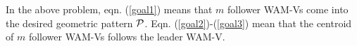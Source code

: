 \documentclass[letterpaper, 10 pt, conference]{ieeeconf}  %
\begin{document}
In the above problem, eqn. (\ref{goal1}) means that
$m$ follower WAM-Vs come into the desired geometric
pattern ${\cal P}$. Eqn. (\ref{goal2})-(\ref{goal3}) mean that the centroid of $m$ follower WAM-Vs follows the leader WAM-V.


\end{document}
